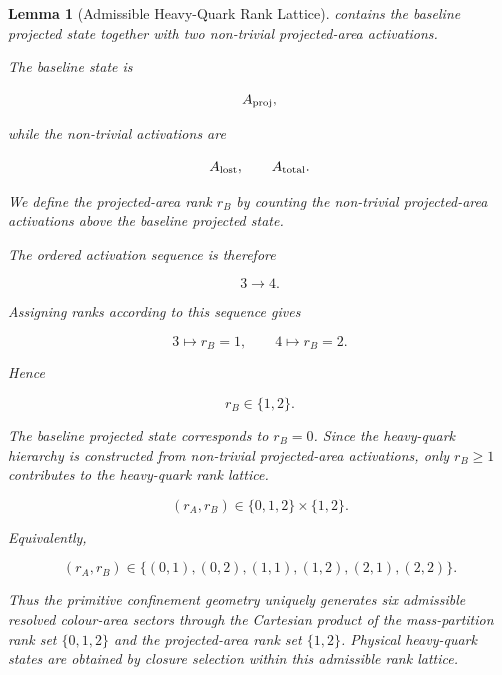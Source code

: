 \documentclass[11pt]{article}
\newtheorem{lemma}[theorem]{Lemma}
\theoremstyle{definition}
\theoremstyle{remark}
\begin{document}
\begin{lemma}[Admissible Heavy-Quark Rank Lattice]
contains the baseline projected state together with two
non-trivial projected-area activations.

The baseline state is

\begin{equation}
A_{\rm proj},
\end{equation}

while the non-trivial activations are

\begin{equation}
A_{\rm lost},
\qquad
A_{\rm total}.
\end{equation}

We define the projected-area rank \(r_B\) by counting the
non-trivial projected-area activations above the baseline
projected state.

The ordered activation sequence is therefore

\begin{equation}
3
\longrightarrow
4.
\end{equation}

Assigning ranks according to this sequence gives

\begin{equation}
3 \mapsto r_B=1,
\qquad
4 \mapsto r_B=2.
\end{equation}

Hence

\begin{equation}
r_B\in\{1,2\}.
\label{eq:rB_values}
\end{equation}

The baseline projected state corresponds to \(r_B=0\).
Since the heavy-quark hierarchy is constructed from non-trivial
projected-area activations, only \(r_B\ge1\) contributes to the
heavy-quark rank lattice.

\begin{equation}
(r_A,r_B)
\in
\{0,1,2\}
\times
\{1,2\}.
\end{equation}

Equivalently,

\begin{equation}
(r_A,r_B)
\in
\{
(0,1),
(0,2),
(1,1),
(1,2),
(2,1),
(2,2)
\}.
\label{eq:heavy_quark_rank_lattice}
\end{equation}

Thus the primitive confinement geometry uniquely generates six
admissible resolved colour-area sectors through the Cartesian
product of the mass-partition rank set \(\{0,1,2\}\) and the
projected-area rank set \(\{1,2\}\). Physical heavy-quark states are obtained by closure selection
within this admissible rank lattice.

\end{lemma}
\end{document}
